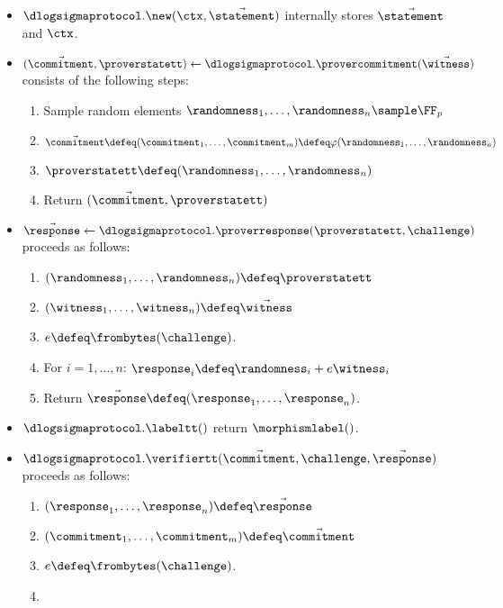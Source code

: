 \documentclass[11pt]{article}
\begin{document}
\begin{itemize}
  \item $\dlogsigmaprotocol.\new(\ctx, \vec\statement)$ internally stores $\vec\statement$ and $\ctx$.
  \item\label{item:basic:p1}
   $(\vec \commitment, \proverstatett) \gets \dlogsigmaprotocol.\provercommitment(\vec \witness)$ consists of the following steps:
    \begin{enumerate}
      \item\label{item:basic:p1:randomness}
        Sample random elements $\randomness_1,\dots,\randomness_n\sample\FF_p$
      \item
         $\vec \commitment \defeq (\commitment_1,\dots,\commitment_m)\defeq\varphi(\randomness_1,\dots,\randomness_n)$
      \item $\proverstatett\defeq (\randomness_1,\dots,\randomness_n)$
      \item
        Return $(\vec \commitment,\proverstatett)$
    \end{enumerate}
  \item\label{item:basic:p2}
    $\vec \response \gets \dlogsigmaprotocol.\proverresponse(\proverstatett,\challenge)$ proceeds as follows:
    \begin{enumerate}
      \item  $(\randomness_1,\dots,\randomness_n)\defeq \proverstatett$
      \item  $(\witness_1,\dots,\witness_n)\defeq \vec \witness$
      \item  $e \defeq \frombytes(\challenge)$.
      \item For $i=1,\dots,n$: $\response_i\defeq \randomness_i+e \witness_i$
			\item Return $\vec\response \defeq (\response_1,\dots,\response_n)$.
    \end{enumerate}
  \item $\dlogsigmaprotocol.\labeltt()$ return $\morphismlabel()$.
  \item\label{item:basic:v}
     $\dlogsigmaprotocol.\verifiertt(\vec \commitment,\challenge,\vec \response)$ proceeds as follows:
    \begin{enumerate}
      \item  $(\response_1, \dots, \response_n) \defeq \vec \response$
      \item $(\commitment_1, \dots, \commitment_m) \defeq \vec \commitment$
      \item  $e \defeq \frombytes(\challenge)$.
      \item\label{item:basic:v:checks}

\end{enumerate}
\end{itemize}
\end{document}
